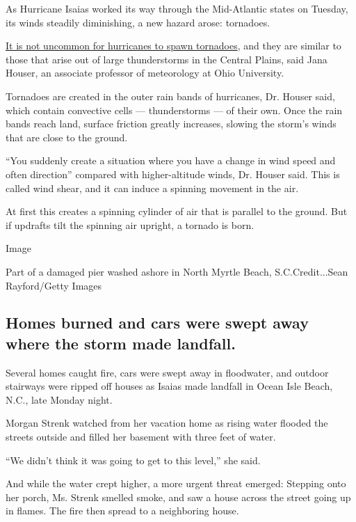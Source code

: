 As Hurricane Isaias worked its way through the Mid-Atlantic states on
Tuesday, its winds steadily diminishing, a new hazard arose: tornadoes.

\href{https://www.nytimes3xbfgragh.onion/2020/08/04/climate/hurricanes-tornadoes.html}{It
is not uncommon for hurricanes to spawn tornadoes}, and they are similar
to those that arise out of large thunderstorms in the Central Plains,
said Jana Houser, an associate professor of meteorology at Ohio
University.

Tornadoes are created in the outer rain bands of hurricanes, Dr. Houser
said, which contain convective cells --- thunderstorms --- of their own.
Once the rain bands reach land, surface friction greatly increases,
slowing the storm's winds that are close to the ground.

``You suddenly create a situation where you have a change in wind speed
and often direction'' compared with higher-altitude winds, Dr. Houser
said. This is called wind shear, and it can induce a spinning movement
in the air.

At first this creates a spinning cylinder of air that is parallel to the
ground. But if updrafts tilt the spinning air upright, a tornado is
born.

Image

Part of a damaged pier washed ashore in North Myrtle Beach,
S.C.Credit...Sean Rayford/Getty Images

\hypertarget{homes-burned-and-cars-were-swept-away-where-the-storm-made-landfall}{%
\subsection{Homes burned and cars were swept away where the storm made
landfall.}\label{homes-burned-and-cars-were-swept-away-where-the-storm-made-landfall}}

Several homes caught fire, cars were swept away in floodwater, and
outdoor stairways were ripped off houses as Isaias made landfall in
Ocean Isle Beach, N.C., late Monday night.

Morgan Strenk watched from her vacation home as rising water flooded the
streets outside and filled her basement with three feet of water.

``We didn't think it was going to get to this level,'' she said.

And while the water crept higher, a more urgent threat emerged: Stepping
onto her porch, Ms. Strenk smelled smoke, and saw a house across the
street going up in flames. The fire then spread to a neighboring house.


